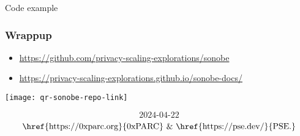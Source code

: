 \documentclass[t]{beamer}
\begin{document}
\begin{frame}{Code example}

\end{frame}


\begin{frame}
\frametitle{Wrappup}
\begin{itemize}
  \item \href{https://github.com/privacy-scaling-explorations/sonobe}{https://github.com/privacy-scaling-explorations/sonobe}
  \item \href{https://privacy-scaling-explorations.github.io/sonobe-docs/}{https://privacy-scaling-explorations.github.io/sonobe-docs/}
\end{itemize}

  \texttt{[image: qr-sonobe-repo-link]}

\tiny{
  $$\text{2024-04-22}$$
  $$\text{\href{https://0xparc.org}{0xPARC}~\&~\href{https://pse.dev/}{PSE.}}$$
}
\end{frame}
\end{document}
